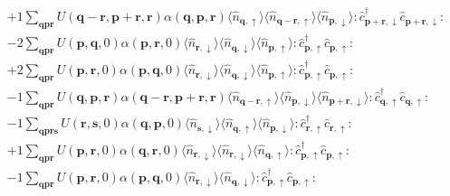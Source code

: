 \begin{align*}
	&+1 \sum_{ \mathbf{q} \mathbf{p} \mathbf{r} } U( \mathbf{q}-\mathbf{r}, \mathbf{p}+\mathbf{r}, \mathbf{r} )  \alpha( \mathbf{q}, \mathbf{p}, \mathbf{r} )   \langle \hat{n}_{ \mathbf{q}, \uparrow } \rangle \langle \hat{n}_{ \mathbf{q}-\mathbf{r}, \uparrow } \rangle \langle \hat{n}_{ \mathbf{p}, \downarrow } \rangle :\hat{c}_{ \mathbf{p}+\mathbf{r}, \downarrow }^\dagger \hat{c}_{ \mathbf{p}+\mathbf{r}, \downarrow }^{\phantom{\dagger}}: \\
	&-2 \sum_{ \mathbf{q} \mathbf{p} \mathbf{r} } U( \mathbf{p}, \mathbf{q}, 0 )  \alpha( \mathbf{p}, \mathbf{r}, 0 )   \langle \hat{n}_{ \mathbf{r}, \downarrow } \rangle \langle \hat{n}_{ \mathbf{q}, \downarrow } \rangle \langle \hat{n}_{ \mathbf{p}, \uparrow } \rangle :\hat{c}_{ \mathbf{p}, \uparrow }^\dagger \hat{c}_{ \mathbf{p}, \uparrow }^{\phantom{\dagger}}: \\
	&+2 \sum_{ \mathbf{q} \mathbf{p} \mathbf{r} } U( \mathbf{p}, \mathbf{r}, 0 )  \alpha( \mathbf{p}, \mathbf{q}, 0 )   \langle \hat{n}_{ \mathbf{r}, \downarrow } \rangle \langle \hat{n}_{ \mathbf{q}, \downarrow } \rangle \langle \hat{n}_{ \mathbf{p}, \uparrow } \rangle :\hat{c}_{ \mathbf{p}, \uparrow }^\dagger \hat{c}_{ \mathbf{p}, \uparrow }^{\phantom{\dagger}}: \\
	&-1 \sum_{ \mathbf{q} \mathbf{p} \mathbf{r} } U( \mathbf{q}, \mathbf{p}, \mathbf{r} )  \alpha( \mathbf{q}-\mathbf{r}, \mathbf{p}+\mathbf{r}, \mathbf{r} )   \langle \hat{n}_{ \mathbf{q}-\mathbf{r}, \uparrow } \rangle \langle \hat{n}_{ \mathbf{p}, \downarrow } \rangle \langle \hat{n}_{ \mathbf{p}+\mathbf{r}, \downarrow } \rangle :\hat{c}_{ \mathbf{q}, \uparrow }^\dagger \hat{c}_{ \mathbf{q}, \uparrow }^{\phantom{\dagger}}: \\
	&-1 \sum_{ \mathbf{q} \mathbf{p} \mathbf{r} \mathbf{s} } U( \mathbf{r}, \mathbf{s}, 0 )  \alpha( \mathbf{q}, \mathbf{p}, 0 )   \langle \hat{n}_{ \mathbf{s}, \downarrow } \rangle \langle \hat{n}_{ \mathbf{q}, \uparrow } \rangle \langle \hat{n}_{ \mathbf{p}, \downarrow } \rangle :\hat{c}_{ \mathbf{r}, \uparrow }^\dagger \hat{c}_{ \mathbf{r}, \uparrow }^{\phantom{\dagger}}: \\
	&+1 \sum_{ \mathbf{q} \mathbf{p} \mathbf{r} } U( \mathbf{p}, \mathbf{r}, 0 )  \alpha( \mathbf{q}, \mathbf{r}, 0 )   \langle \hat{n}_{ \mathbf{r}, \downarrow } \rangle \langle \hat{n}_{ \mathbf{r}, \downarrow } \rangle \langle \hat{n}_{ \mathbf{q}, \uparrow } \rangle :\hat{c}_{ \mathbf{p}, \uparrow }^\dagger \hat{c}_{ \mathbf{p}, \uparrow }^{\phantom{\dagger}}: \\
	&-1 \sum_{ \mathbf{q} \mathbf{p} \mathbf{r} } U( \mathbf{p}, \mathbf{r}, 0 )  \alpha( \mathbf{p}, \mathbf{q}, 0 )   \langle \hat{n}_{ \mathbf{r}, \downarrow } \rangle \langle \hat{n}_{ \mathbf{q}, \downarrow } \rangle :\hat{c}_{ \mathbf{p}, \uparrow }^\dagger \hat{c}_{ \mathbf{p}, \uparrow }^{\phantom{\dagger}}: \\

\end{align*}
